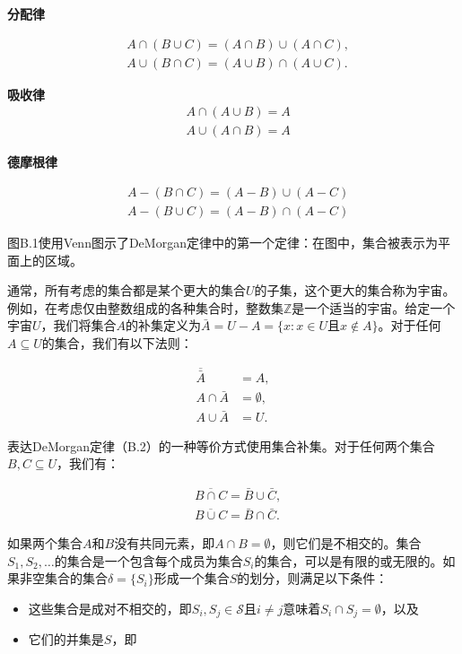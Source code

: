 \documentclass[lang=cn,newtx,10pt,scheme=chinese]{elegantbook}
\begin{document}
\textbf{分配律}

$$
\begin{aligned}
& A \cap(B \cup C)=(A \cap B) \cup(A \cap C), \\
& A \cup(B \cap C)=(A \cup B) \cap(A \cup C) .
\end{aligned}
$$

\textbf{吸收律}
$$
\begin{aligned}
& A \cap(A \cup B)=A \\
& A \cup(A \cap B)=A
\end{aligned}
$$

\textbf{德摩根律}

$$
\begin{aligned}
& A-(B \cap C)=(A-B) \cup(A-C) \\
& A-(B \cup C)=(A-B) \cap(A-C)
\end{aligned}
$$

图B.1使用Venn图示了DeMorgan定律中的第一个定律：在图中，集合被表示为平面上的区域。

通常，所有考虑的集合都是某个更大的集合$U$的子集，这个更大的集合称为宇宙。例如，在考虑仅由整数组成的各种集合时，整数集$\mathbb{Z}$是一个适当的宇宙。给定一个宇宙$U$，我们将集合$A$的补集定义为$\bar{A}=U-A=\{x: x \in U$且$x \notin A\}$。对于任何$A \subseteq U$的集合，我们有以下法则：

$$
\begin{aligned}
\overline{\bar{A}} & =A, \\
A \cap \bar{A} & =\emptyset, \\
A \cup \bar{A} & =U .
\end{aligned}
$$

表达DeMorgan定律（B.2）的一种等价方式使用集合补集。对于任何两个集合$B, C \subseteq U$，我们有：

$$
\begin{aligned}
& \overline{B \cap C}=\bar{B} \cup \bar{C}, \\
& \overline{B \cup C}=\bar{B} \cap \bar{C} .
\end{aligned}
$$

如果两个集合$A$和$B$没有共同元素，即$A \cap B=\emptyset$，则它们是不相交的。集合$S_1, S_2, \ldots$的集合是一个包含每个成员为集合$S_i$的集合，可以是有限的或无限的。如果非空集合的集合$\delta=\{S_i\}$形成一个集合$S$的划分，则满足以下条件：

\begin{itemize}
\item 这些集合是成对不相交的，即$S_i, S_j \in \mathcal{S}$且$i \neq j$意味着$S_i \cap S_j=\emptyset$，以及
\item 它们的并集是$S$，即
\end{itemize}
\end{document}

